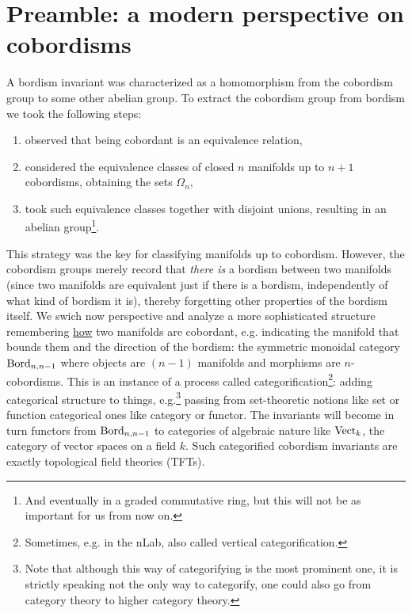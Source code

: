 \chapter*{Preamble: a modern perspective on cobordisms}

A bordism invariant was characterized as a homomorphism from the cobordism group to some other abelian group. 
To extract the cobordism group from bordism we took the following steps:
\begin{enumerate}
    \item observed that being cobordant is an equivalence relation,
    \item considered the equivalence classes of closed $n$ manifolds up to $n+1$ cobordisms, obtaining the sets $\Omega_n$,
    \item took such equivalence classes together with disjoint unions, resulting in an abelian group\footnote{And eventually in a \Z graded commutative ring, but this will not be as important for us from now on.}.
\end{enumerate} 
This strategy was the key for classifying manifolds up to cobordism. 
However, the cobordism groups merely record that \emph{there is} a bordism between two manifolds (since two manifolds are equivalent just if there is a bordism, independently of what kind of bordism it is), 
thereby forgetting other properties of the bordism itself. 
We swich now perspective and analyze a more sophisticated structure remembering \underline{how} two manifolds are cobordant, 
e.g. indicating the manifold that bounds them and the direction of the bordism: the symmetric monoidal category $\operatorname{Bord}_{n,n-1}$ where objects are $(n-1)$ manifolds and morphisms are $n$-cobordisms. This is an instance of a process called categorification\footnote{Sometimes, e.g. in the nLab, also called vertical categorification.}: adding categorical structure to things, 
e.g.\footnote{Note that although this way of categorifying is the most prominent one, it is strictly speaking not the only way to categorify, one could also go from category theory to higher category theory.} 
passing from set-theoretic notions like set or function  categorical ones like category or functor. 
The invariants will become in turn functors from $\operatorname{Bord}_{n,n-1}$ to categories of algebraic nature like $\operatorname{Vect}_k$, the category of vector spaces on a field $k$. 
Such categorified cobordism invariants are exactly topological field theories (TFTs). 

